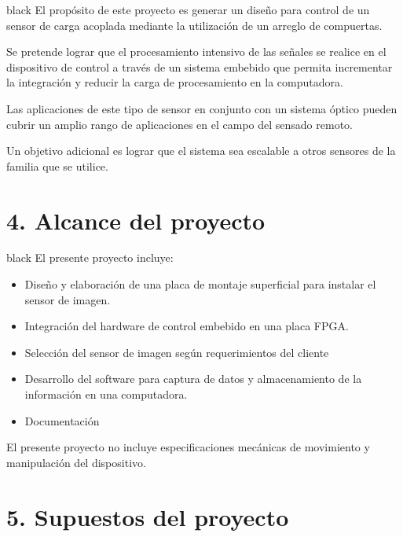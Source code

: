 \documentclass[
11pt, %
codirector, %
]{charter}
\begin{document}
\begin{consigna}{black}
El propósito de este proyecto es generar un diseño para control de un sensor de carga acoplada mediante la utilización de un arreglo de compuertas.

Se pretende lograr que el procesamiento intensivo de las señales se realice en el dispositivo de control a través de un sistema embebido que permita incrementar la integración y reducir la carga de procesamiento en la computadora. 

Las aplicaciones de este tipo de sensor en conjunto con un sistema óptico pueden cubrir un amplio rango de aplicaciones en el campo del sensado remoto.

Un objetivo adicional es lograr que el sistema sea escalable a otros sensores de la familia que se utilice.

\end{consigna}

\section{4. Alcance del proyecto}
\label{sec:alcance}

\begin{consigna}{black}
El presente proyecto incluye:

\begin{itemize}
	\item Diseño y elaboración de una placa de montaje superficial para instalar el sensor de imagen.
	\item Integración del hardware de control embebido en una placa FPGA.
	\item Selección del sensor de imagen según requerimientos del cliente
	\item Desarrollo del software para captura de datos y almacenamiento de la información en una computadora.
	\item Documentación

\end{itemize}

El presente proyecto no incluye especificaciones mecánicas de movimiento y manipulación del dispositivo.

\end{consigna}


\section{5. Supuestos del proyecto}
\label{sec:supuestos}
\end{document}
